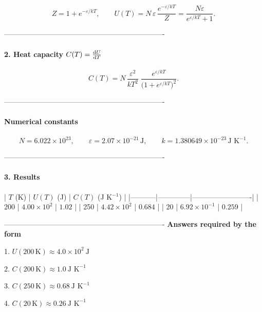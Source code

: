 \documentclass[12pt]{article}
\theoremstyle{definition} %
\theoremstyle{plain} %
\begin{document}
\[
  Z = 1 + e^{-\varepsilon/kT},
  \qquad
  U(T) = N\,\varepsilon\,\frac{e^{-\varepsilon/kT}}{Z}
        = \frac{N\varepsilon}{e^{\varepsilon/kT}+1}.
\]

-------------------------------------------------------------------
\paragraph{2.  Heat capacity \(C(T)=\dv{U}{T}\)}

\[
  C(T)
  = N\,\frac{\varepsilon^{2}}{kT^{2}}\;
    \frac{e^{\varepsilon/kT}}
         {\bigl(1+e^{\varepsilon/kT}\bigr)^{2}}.
\]

-------------------------------------------------------------------
\paragraph{Numerical constants}

\[
  N = 6.022\times10^{23},\qquad
  \varepsilon = 2.07\times10^{-21}\,\text{J},\qquad
  k = 1.380649\times10^{-23}\,\text{J K}^{-1}.
\]

-------------------------------------------------------------------
\paragraph{3.  Results}

| \(T\) (K) | \(U(T)\) (J) | \(C(T)\) (J K\(^{-1}\)) |
|-----------|--------------|-------------------------|
| 200 | \(4.00\times10^{2}\) | \(1.02\) |
| 250 | \(4.42\times10^{2}\) | \(0.684\) |
|  20 | \(6.92\times10^{-1}\) | \(0.259\) |

-------------------------------------------------------------------
\textbf{Answers required by the form}

1. \(U(200\,\text{K}) \approx 4.0\times10^{2}\ \text{J}\)

2. \(C(200\,\text{K}) \approx 1.0\ \text{J K}^{-1}\)

3. \(C(250\,\text{K}) \approx 0.68\ \text{J K}^{-1}\)

4. \(C(20\,\text{K})  \approx 0.26\ \text{J K}^{-1}\)
\end{document}

